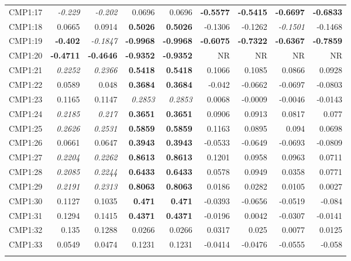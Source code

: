 \documentclass[review]{elsarticle}
\begin{document}
\begin{center}
\begin{longtable}{lrrrrrrrr}
CMP1:17 & \textit{-0.229} & \textit{-0.202} & 0.0696 & 0.0696 & \textbf{-0.5577} & \textbf{-0.5415} & \textbf{-0.6697} & \textbf{-0.6833}\\
CMP1:18 & 0.0665 & 0.0914 & \textbf{0.5026} & \textbf{0.5026} & -0.1306 & -0.1262 & \textit{-0.1501} & -0.1468\\
CMP1:19 & \textbf{-0.402} & \textit{-0.1847} & \textbf{-0.9968} & \textbf{-0.9968} & \textbf{-0.6075} & \textbf{-0.7322} & \textbf{-0.6367} & \textbf{-0.7859} \\
CMP1:20 & \textbf{-0.4711} & \textbf{-0.4646} & \textbf{-0.9352} & \textbf{-0.9352} & NR & NR & NR & NR\\
CMP1:21 & \textit{0.2252} & \textit{0.2366} & \textbf{0.5418} & \textbf{0.5418} & 0.1066 & 0.1085 & 0.0866 & 0.0928\\
CMP1:22 & 0.0589 & 0.048 & \textbf{0.3684} & \textbf{0.3684} & -0.042 & -0.0662 & -0.0697 & -0.0803\\
CMP1:23 & 0.1165 & 0.1147 & \textit{0.2853} & \textit{0.2853} & 0.0068 & -0.0009 & -0.0046 & -0.0143\\
CMP1:24 & \textit{0.2185} & \textit{0.217} & \textbf{0.3651} & \textbf{0.3651} & 0.0906 & 0.0913 & 0.0817 & 0.077\\
CMP1:25 & \textit{0.2626} & \textit{0.2531} & \textbf{0.5859} & \textbf{0.5859} & 0.1163 & 0.0895 & 0.094 & 0.0698\\
CMP1:26 & 0.0661 & 0.0647 & \textbf{0.3943} & \textbf{0.3943} & -0.0533 & -0.0649 & -0.0693 & -0.0809\\
CMP1:27 & \textit{0.2204} & \textit{0.2262} & \textbf{0.8613} & \textbf{0.8613} & 0.1201 & 0.0958 & 0.0963 & 0.0711\\
CMP1:28 & \textit{0.2085} & \textit{0.2244} & \textbf{0.6433} & \textbf{0.6433} & 0.0578 & 0.0949 & 0.0358 & 0.0771\\
CMP1:29 & \textit{0.2191} & \textit{0.2313} & \textbf{0.8063} & \textbf{0.8063} & 0.0186 & 0.0282 & 0.0105 & 0.0027\\
CMP1:30 & 0.1127 & 0.1035 & \textbf{0.471} & \textbf{0.471} & -0.0393 & -0.0656 & -0.0519 & -0.084\\
CMP1:31 & 0.1294 & 0.1415 & \textbf{0.4371} & \textbf{0.4371} & -0.0196 & 0.0042 & -0.0307 & -0.0141\\
CMP1:32 & 0.135 & 0.1288 & 0.0266 & 0.0266 & 0.0317 & 0.025 & 0.0077 & 0.0125\\
CMP1:33 & 0.0549 & 0.0474 & 0.1231 & 0.1231 & -0.0414 & -0.0476 & -0.0555 & -0.058\\
\hline\\

\end{longtable}
\end{center}
\end{document}
